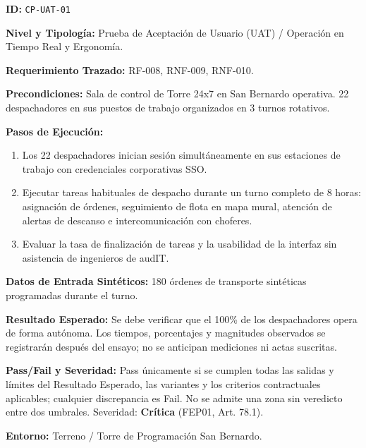 \par\noindent\textbf{ID:} \texttt{C\allowbreak{}P\allowbreak{}-\allowbreak{}U\allowbreak{}A\allowbreak{}T\allowbreak{}-\allowbreak{}0\allowbreak{}1\allowbreak{}}\par
\par\noindent\textbf{Nivel y Tipología:} Prueba de Aceptación de Usuario (UAT) / Operación en Tiempo Real y Ergonomía.\par
\par\noindent\textbf{Requerimiento Trazado:} RF-008, RNF-009, RNF-010.\par
\par\noindent\textbf{Precondiciones:} Sala de control de Torre 24x7 en San Bernardo operativa. 22 despachadores en sus puestos de trabajo organizados en 3 turnos rotativos.\par
\par\noindent\textbf{Pasos de Ejecución:} \par
\begin{enumerate}
\item Los 22 despachadores inician sesión simultáneamente en sus estaciones de trabajo con credenciales corporativas SSO.
\item Ejecutar tareas habituales de despacho durante un turno completo de 8 horas: asignación de órdenes, seguimiento de flota en mapa mural, atención de alertas de descanso e intercomunicación con choferes.
\item Evaluar la tasa de finalización de tareas y la usabilidad de la interfaz sin asistencia de ingenieros de audIT.
\end{enumerate}
\par\noindent\textbf{Datos de Entrada Sintéticos:} 180 órdenes de transporte sintéticas programadas durante el turno.\par
\par\noindent\textbf{Resultado Esperado:} Se debe verificar que el 100\% de los despachadores opera de forma autónoma. Los tiempos, porcentajes y magnitudes observados se registrarán después del ensayo; no se anticipan mediciones ni actas suscritas.\par
\par\noindent\textbf{Pass/Fail y Severidad:} Pass únicamente si se cumplen todas las salidas y límites del Resultado Esperado, las variantes y los criterios contractuales aplicables; cualquier discrepancia es Fail. No se admite una zona sin veredicto entre dos umbrales. Severidad: \textbf{Crítica} (FEP01, Art. 78.1).\par
\par\noindent\textbf{Entorno:} Terreno / Torre de Programación San Bernardo.\par




